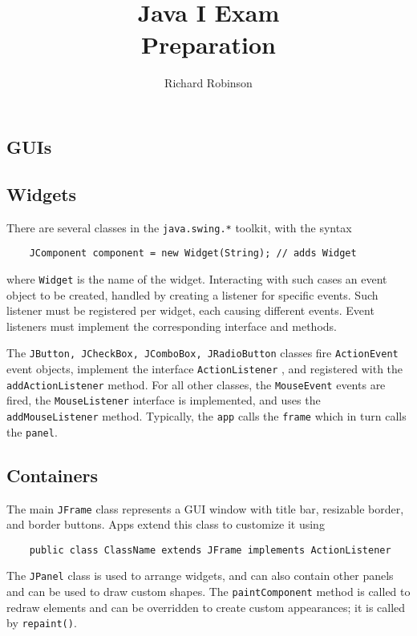 \documentclass[letterpaper, openany, justified]{tufte-book}
\title{\\Java I Exam \\Preparation}
\author{Richard Robinson}
\newcommand{\cd}[1]{\lstinline{#1}}
\begin{document}
\maketitle
\setlength{\parindent}{0pt}
\begin{fullwidth}

\chapter{GUIs}

\section{Widgets}
There are several classes in the \lstinline{java.swing.*} toolkit, with the syntax \begin{lstlisting}
    JComponent component = new Widget(String); // adds Widget
\end{lstlisting}
where \lstinline{Widget} is the name of the widget. Interacting with such cases an event object to be created, handled by creating a listener for specific events. Such listener must be registered per widget, each causing different events. Event listeners must implement the corresponding interface and methods.

\bigskip
The \lstinline{JButton, JCheckBox, JComboBox, JRadioButton} classes fire \lstinline{ActionEvent} event objects, implement the interface \lstinline{ActionListener} , and registered with the \lstinline{addActionListener} method. For all other classes, the \lstinline{MouseEvent} events are fired, the \lstinline{MouseListener} interface is implemented, and uses the \lstinline{addMouseListener} method. Typically, the \lstinline{app} calls the \cd{frame} which in turn calls the \cd{panel}.

\section{Containers}
The main \lstinline{JFrame} class represents a GUI window with title bar, resizable border, and border buttons. Apps extend this class to customize  it using \begin{lstlisting}
    public class ClassName extends JFrame implements ActionListener
\end{lstlisting}
The \cd{JPanel} class is used to arrange widgets, and can also contain other panels and can be used to draw custom shapes. The \cd{paintComponent} method is called to redraw elements and can be overridden to create custom appearances; it is called by \cd{repaint()}.


\end{fullwidth}
\end{document}
